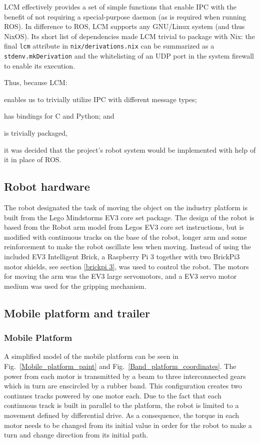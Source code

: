 LCM effectively provides a set of simple functions that enable IPC with the benefit of not requiring a special-purpose daemon (as is required when running ROS).
In difference to ROS, LCM supports any GNU/Linux system (and thus NixOS).
Its short list of dependencies made LCM trivial to package with Nix:
the final \texttt{lcm} attribute in \texttt{nix/derivations.nix} can be summarized as a \texttt{stdenv.mkDerivation} and the whitelisting of an UDP port in the system firewall to enable its execution.

Thus, because LCM:
\begin{inline-enum}
\item enables us to trivially utilize IPC with different message types;
\item has bindings for C and Python; and
\item is trivially packaged,
\end{inline-enum}
it was decided that the project's robot system would be implemented with help of it in place of ROS.

\subsection{Robot hardware}
The robot designated the task of moving the object on the industry platform is built from the Lego Mindstorms EV3 core set package. The design of the robot is based from the Robot arm model from Legos EV3 core set instructions, but is modified with continuous tracks on the base of the robot, longer arm and some reinforcement to make the robot oscillate less when moving. Instead of using the included EV3 Intelligent Brick, a Raspberry Pi 3 together with two BrickPi3 motor shields, see section \ref{brickpi 3}, was used to control the robot. The motors for moving the arm was the EV3 large servomotors, and a EV3 servo motor medium was used for the gripping mechanism.



\subsection {Mobile platform and trailer}
\subsubsection{Mobile Platform}
A simplified model of the mobile platform can be seen in Fig.~\ref{Mobile_platform_paint} and Fig.~\ref{Band_platform_coordinates}. The power from each motor is transmitted by a beam to three interconnected gears which in turn are enscircled by a rubber band. This configuration  creates two continues tracks powered by one motor each. Due to the fact that each continuous track is built in parallel to the platform, the robot is limited to a movement defined by differential drive. As a consequence, the torque in each motor needs to be changed from its initial value in order for the robot to make a turn and change direction from its initial path.



